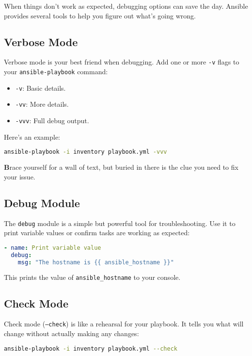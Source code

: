 When things don't work as expected, debugging options can save the day. Ansible provides several tools to help you figure out what's going wrong.

\subsection{Verbose Mode}

Verbose mode is your best friend when debugging. Add one or more \texttt{-v} flags to your \texttt{ansible-playbook} command:
\begin{itemize}
    \item \texttt{-v}: Basic details.
    \item \texttt{-vv}: More details.
    \item \texttt{-vvv}: Full debug output.
\end{itemize}

Here's an example:
\begin{lstlisting}[language=bash, caption=Running a Playbook with Verbose Output]
ansible-playbook -i inventory playbook.yml -vvv
\end{lstlisting}

\textbf{B}race yourself for a wall of text, but buried in there is the clue you need to fix your issue.

\subsection{Debug Module}

The \texttt{debug} module is a simple but powerful tool for troubleshooting. Use it to print variable values or confirm tasks are working as expected:
\begin{lstlisting}[language=yaml, caption=Using the Debug Module]
- name: Print variable value
  debug:
    msg: "The hostname is {{ ansible_hostname }}"
\end{lstlisting}

This prints the value of \texttt{ansible\_hostname} to your console.

\subsection{Check Mode}

Check mode (\texttt{--check}) is like a rehearsal for your playbook. It tells you what will change without actually making any changes:
\begin{lstlisting}[language=bash, caption=Running a Playbook in Check Mode]
ansible-playbook -i inventory playbook.yml --check
\end{lstlisting}

